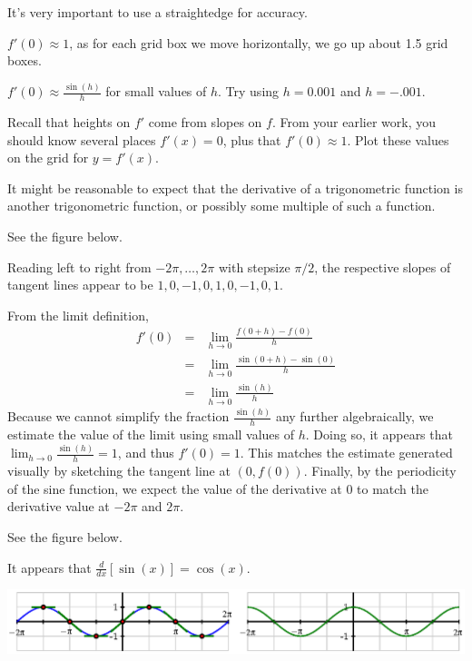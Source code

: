 \begin{bighint}
\ba
	\item It's very important to use a straightedge for accuracy.
	\item $f'(0) \approx 1$, as for each grid box we move horizontally, we go up about 1.5 grid boxes.
	\item $f'(0) \approx \frac{\sin(h)}{h}$ for small values of $h$.  Try using $h = 0.001$ and $h = -.001$. 
	\item Recall that heights on $f'$ come from slopes on $f$.  From your earlier work, you should know several places $f'(x) = 0$, plus that $f'(0) \approx 1$.  Plot these values on the grid for $y = f'(x)$.
	\item It might be reasonable to expect that the derivative of a trigonometric function is another trigonometric function, or possibly some multiple of such a function.
\ea 
\end{bighint}
\begin{activitySolution}
\ba
	\item See the figure below.
	\item Reading left to right from $-2\pi, \ldots, 2\pi$ with stepsize $\pi/2$, the respective slopes of tangent lines appear to be $1,0,-1,0,1,0,-1,0,1$.
	\item From the limit definition,
	\begin{eqnarray*}
	f'(0) & = & \lim_{h \to 0} \frac{f(0 + h) - f(0)}{h} \\
	       & = & \lim_{h \to 0} \frac{\sin(0 + h) - \sin(0)}{h} \\
	       & = & \lim_{h \to 0} \frac{\sin(h)}{h} 
	\end{eqnarray*}
	Because we cannot simplify the fraction $\frac{\sin(h)}{h}$ any further algebraically, we estimate the value of the limit using small values of $h$.  Doing so, it appears that $\lim_{h \to 0} \frac{\sin(h)}{h}  = 1$, and thus $f'(0) = 1$.  This matches the estimate generated visually by sketching the tangent line at $(0,f(0))$.  Finally, by the periodicity of the sine function, we expect the value of the derivative at 0 to match the derivative value at $-2\pi$ and $2\pi$.
	\item See the figure below.
	\item It appears that $\frac{d}{dx}[\sin(x)] = \cos(x)$.
\ea
\begin{center}
\includegraphics{figures/2_2_sineSoln.eps}
\end{center}
\end{activitySolution}
\aftera